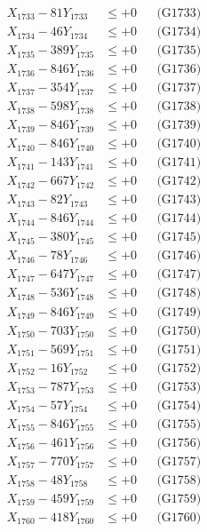 \documentclass[a4paper,10pt]{article}
\begin{document}
{\begin{align}
X_{1733} - 81Y_{1733} &\leq +0 && \text{(G1733)} \\
X_{1734} - 46Y_{1734} &\leq +0 && \text{(G1734)} \\
X_{1735} - 389Y_{1735} &\leq +0 && \text{(G1735)} \\
X_{1736} - 846Y_{1736} &\leq +0 && \text{(G1736)} \\
X_{1737} - 354Y_{1737} &\leq +0 && \text{(G1737)} \\
X_{1738} - 598Y_{1738} &\leq +0 && \text{(G1738)} \\
X_{1739} - 846Y_{1739} &\leq +0 && \text{(G1739)} \\
X_{1740} - 846Y_{1740} &\leq +0 && \text{(G1740)} \\
\allowbreak
X_{1741} - 143Y_{1741} &\leq +0 && \text{(G1741)} \\
X_{1742} - 667Y_{1742} &\leq +0 && \text{(G1742)} \\
X_{1743} - 82Y_{1743} &\leq +0 && \text{(G1743)} \\
X_{1744} - 846Y_{1744} &\leq +0 && \text{(G1744)} \\
X_{1745} - 380Y_{1745} &\leq +0 && \text{(G1745)} \\
X_{1746} - 78Y_{1746} &\leq +0 && \text{(G1746)} \\
X_{1747} - 647Y_{1747} &\leq +0 && \text{(G1747)} \\
X_{1748} - 536Y_{1748} &\leq +0 && \text{(G1748)} \\
X_{1749} - 846Y_{1749} &\leq +0 && \text{(G1749)} \\
X_{1750} - 703Y_{1750} &\leq +0 && \text{(G1750)} \\
\allowbreak
X_{1751} - 569Y_{1751} &\leq +0 && \text{(G1751)} \\
X_{1752} - 16Y_{1752} &\leq +0 && \text{(G1752)} \\
X_{1753} - 787Y_{1753} &\leq +0 && \text{(G1753)} \\
X_{1754} - 57Y_{1754} &\leq +0 && \text{(G1754)} \\
X_{1755} - 846Y_{1755} &\leq +0 && \text{(G1755)} \\
X_{1756} - 461Y_{1756} &\leq +0 && \text{(G1756)} \\
X_{1757} - 770Y_{1757} &\leq +0 && \text{(G1757)} \\
X_{1758} - 48Y_{1758} &\leq +0 && \text{(G1758)} \\
X_{1759} - 459Y_{1759} &\leq +0 && \text{(G1759)} \\
X_{1760} - 418Y_{1760} &\leq +0 && \text{(G1760)} \\

\end{align}}
\end{document}
